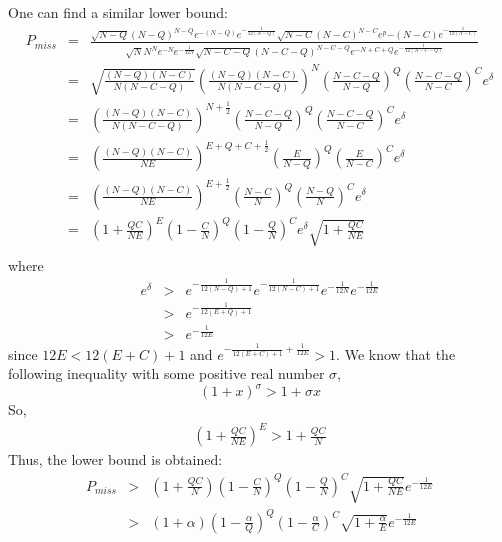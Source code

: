 \documentclass[9.5pt,journal,final,finalsubmission,twocolumn]{IEEEtran}
\begin{document}
One can find a similar lower bound:
\begin{eqnarray*}
P_{miss} &=& \frac{\sqrt{N-Q}(N-Q)^{N-Q} e^{-(N-Q)} e^{-\frac{1}{12(N-Q)}} \sqrt{N-C}(N-C)^{N-C} e^p{-(N-C)} e^{-\frac{1}{12(N-C)}}} {\sqrt{N}N^N e^{-N} e^{-\frac{1}{12N}} \sqrt{N-C-Q}(N-C-Q)^{N-C-Q} e^{-N+C+Q} e^{-\frac{1}{12(N-C-Q)}}}\\
         &=& \sqrt{\frac{(N-Q)(N-C)}{N(N-C-Q)}} \left(\frac{(N-Q)(N-C)}{N(N-C-Q)}\right)^{N} \left(\frac{N-C-Q}{N-Q}\right)^{Q} \left(\frac{N-C-Q}{N-C}\right)^{C} e^{\delta}\\
         &=& \left(\frac{(N-Q)(N-C)}{N(N-C-Q)}\right)^{N+\frac{1}{2}} \left(\frac{N-C-Q}{N-Q}\right)^{Q} \left(\frac{N-C-Q}{N-C}\right)^{C} e^{\delta}\\
         &=& \left(\frac{(N-Q)(N-C)}{NE}\right)^{E+Q+C+\frac{1}{2}} \left(\frac{E}{N-Q}\right)^{Q} \left(\frac{E}{N-C}\right)^{C} e^{\delta}\\
         &=& \left(\frac{(N-Q)(N-C)}{NE}\right)^{E+\frac{1}{2}} \left(\frac{N-C}{N}\right)^{Q} \left(\frac{N-Q}{N}\right)^{C} e^{\delta}\\
         &=&   \left(1+\frac{QC}{NE}\right)^{E} \left(1-\frac{C}{N}\right)^{Q} \left(1-\frac{Q}{N}\right)^{C} e^{\delta} \sqrt{1+\frac{QC}{NE}}\\
\end{eqnarray*}
where
\begin{eqnarray}
e^{\delta} &>& e^{-\frac{1}{12(N-Q)+1}} e^{-\frac{1}{12(N-C)+1}} e^{-\frac{1}{12N}} e^{-\frac{1}{12E}}\\
           &>& e^{-\frac{1}{12(E+Q)+1}}\\
           &>& e^{-\frac{1}{12E}}
\end{eqnarray}
since $12E<12(E+C)+1$ and $e^{-\frac{1}{12(E+C)+1}+\frac{1}{12E}}>1$.
We know that the following inequality with some positive real number $\sigma$,
\begin{equation}
(1+x)^\sigma > 1+\sigma x
\end{equation}
So,
\begin{eqnarray}
\left(1+\frac{QC}{NE}\right)^E > 1+\frac{QC}{N}
\end{eqnarray}
Thus, the lower bound is obtained:
\begin{eqnarray}
P_{miss} &>& \left(1+\frac{QC}{N}\right)\left(1-\frac{C}{N}\right)^Q\left(1-\frac{Q}{N}\right)^C \sqrt{1+\frac{QC}{NE}} e^{-\frac{1}{12E}}\\
         &>& (1+\alpha)\left(1-\frac{\alpha}{Q}\right)^Q \left(1-\frac{\alpha}{C}\right)^C \sqrt{1+\frac{\alpha}{E}} e^{-\frac{1}{12E}}
\end{eqnarray}
\end{document}
